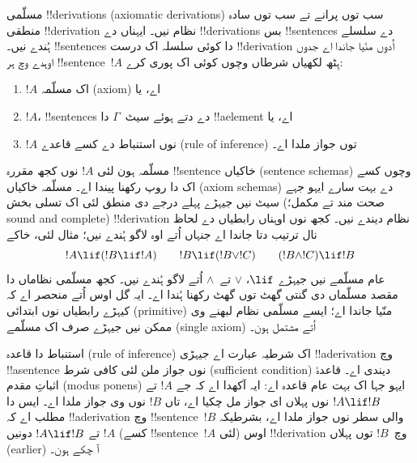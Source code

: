 \documentclass[../../../include/open-logic-section]{subfiles}
\begin{document}
      {}
      {}


مسلّمی !!{derivation}s (axiomatic derivations) سب توں پرانے تے سب توں سادہ منطقی
!!{derivation} نظام نیں۔ ایہناں دے !!{derivation}s بس !!{sentence}s دے
سلسلے ہُندے نیں۔ !!{sentence}s دا کوئی سلسلہ اک درست !!{derivation}
اُدوں منّیا جاندا اے جدوں اوہدے وچ ہر !!{sentence}~$!A$ ہِٹھ لکھیاں
شرطاں وچوں کوئی اک پوری کرے:
\begin{enumerate}
\item $!A$ اک مسلّمہ (axiom) اے، یا
\item $!A$، !!{sentence}s دے دتے ہوئے سیٹ~$\Gamma$ دا !!a{element} اے، یا
\item $!A$ نوں استنباط دے کسے قاعدے (rule of inference) توں جواز ملدا اے۔
\end{enumerate}
مسلّمہ ہون لئی $!A$ نوں کجھ مقررہ !!{sentence} خاکیاں (sentence
schemas) وچوں کسے اک دا روپ رکھنا پیندا اے۔ مسلّمہ خاکیاں (axiom
schemas) دے بہت سارے ایہو جہے سیٹ نیں جیہڑے پہلے درجے دی منطق لئی اک
تسلی بخش (صحت مند تے مکمل؛ sound and complete) !!{derivation} نظام
دیندے نیں۔ کجھ نوں اوہناں رابطیاں دے لحاظ نال ترتیب دتا جاندا اے
جنہاں اُتے اوہ لاگو ہُندے نیں؛ مثال لئی، خاکے
\[
!A \lif (!B \lif !A) \qquad !B \lif (!B \lor !C) \qquad (!B \land !C) \lif !B
\]
عام مسلّمے نیں جیہڑے $\lif$، $\lor$ تے~$\land$ اُتے لاگو ہُندے نیں۔
کجھ مسلّمی نظاماں دا مقصد مسلّماں دی گنتی گھٹ توں گھٹ رکھنا ہُندا
اے۔ ایہ گل اوس اُتے منحصر اے کہ کیہڑے رابطیاں نوں ابتدائی (primitive)
منّیا جاندا اے؛ ایسے مسلّمی نظام لبھنے وی ممکن نیں جیہڑے صرف اک
مسلّمے (single axiom) اُتے مشتمل ہون۔

استنباط دا قاعدہ (rule of inference) اک شرطیہ عبارت اے جیہڑی
!!a{derivation} وچ !!a{sentence} نوں جواز ملن لئی کافی شرط (sufficient
condition) دیندی اے۔ قاعدۂ اثباتِ مقدم (modus ponens)
ایہو جہا اک بہت عام قاعدہ اے: ایہ آکھدا اے کہ جے $!A$ تے $!A \lif
!B$ نوں پہلاں ای جواز مل چکیا اے، تاں $!B$ نوں وی جواز ملدا اے۔ ایس
دا مطلب اے کہ !!a{derivation} وچ !!{sentence}~$!B$ والی سطر نوں جواز
ملدا اے، بشرطیکہ $!A$ تے $!A \lif !B$ دونیں (کسے
!!{sentence}~$!A$ لئی) اوس !!{derivation} وچ~$!B$ توں پہلاں (earlier)
آ چکے ہون۔
\end{document}
